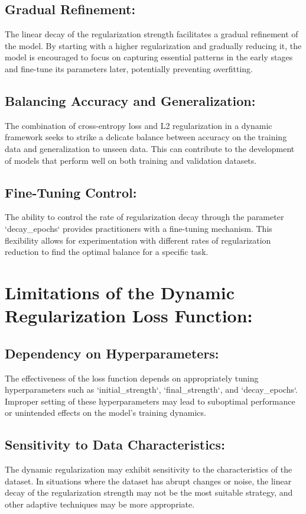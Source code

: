 \documentclass{article}
\begin{document}
\subsection{Gradual Refinement:}
The linear decay of the regularization strength facilitates a gradual refinement of the model. By starting with a higher regularization and gradually reducing it, the model is encouraged to focus on capturing essential patterns in the early stages and fine-tune its parameters later, potentially preventing overfitting.

\subsection{Balancing Accuracy and Generalization:}
The combination of cross-entropy loss and L2 regularization in a dynamic framework seeks to strike a delicate balance between accuracy on the training data and generalization to unseen data. This can contribute to the development of models that perform well on both training and validation datasets.

\subsection{Fine-Tuning Control:}
The ability to control the rate of regularization decay through the parameter `decay\_epochs` provides practitioners with a fine-tuning mechanism. This flexibility allows for experimentation with different rates of regularization reduction to find the optimal balance for a specific task.

\section{Limitations of the Dynamic Regularization Loss Function:}

\subsection{Dependency on Hyperparameters:}
The effectiveness of the loss function depends on appropriately tuning hyperparameters such as `initial\_strength`, `final\_strength`, and `decay\_epochs`. Improper setting of these hyperparameters may lead to suboptimal performance or unintended effects on the model's training dynamics.

\subsection{Sensitivity to Data Characteristics:}
The dynamic regularization may exhibit sensitivity to the characteristics of the dataset. In situations where the dataset has abrupt changes or noise, the linear decay of the regularization strength may not be the most suitable strategy, and other adaptive techniques may be more appropriate.
\end{document}
